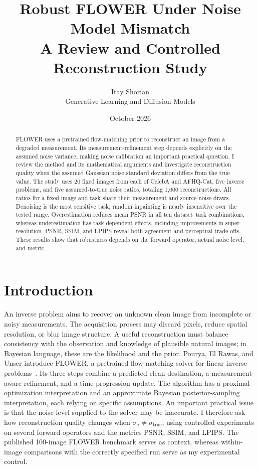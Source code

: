 \documentclass[11pt,a4paper]{article}
\title{
    \textbf{Robust FLOWER Under Noise Model Mismatch}\\[2mm]
    \large A Review and Controlled Reconstruction Study
}
\author{
    Itay Shorian\\
    Generative Learning and Diffusion Models
}
\date{October 2026}
\newcommand{\sx}{\sigma_{\mathrm{true}}}
\newcommand{\sa}{\sigma_a}
\begin{document}
\maketitle


\begin{abstract}

\noindent FLOWER uses a pretrained flow-matching prior to reconstruct an image
from a degraded measurement. Its measurement-refinement step depends
explicitly on the assumed noise variance, making noise calibration
an important practical question.
I review the method and its mathematical arguments and investigate
reconstruction quality when the assumed Gaussian noise standard
deviation differs from the true value.
The study uses 20 fixed images from each of CelebA and AFHQ-Cat,
five inverse problems, and five assumed-to-true noise ratios,
totaling 1,000 reconstructions. All ratios for a fixed image and task
share their measurement and source-noise draws.
Denoising is the most sensitive task; random inpainting is nearly
insensitive over the tested range. Overestimation reduces mean PSNR
in all ten dataset--task combinations, whereas underestimation has
task-dependent effects, including improvements in super-resolution.
PSNR, SSIM, and LPIPS reveal both agreement and perceptual trade-offs.
These results show that robustness depends on the forward operator,
actual noise level, and metric.
\end{abstract}



\section{Introduction}

An inverse problem aims to recover an unknown clean image from
incomplete or noisy measurements. The acquisition process may discard
pixels, reduce spatial resolution, or blur image structure.
A useful reconstruction must balance consistency with the observation
and knowledge of plausible natural images; in Bayesian language,
these are the likelihood and the prior.
Pourya, El Rawas, and Unser introduce FLOWER, a pretrained
flow-matching solver for linear inverse problems~\cite{flower}.
Its three steps combine a predicted clean destination,
a measurement-aware refinement, and a time-progression update.
The algorithm has a proximal-optimization interpretation and an
approximate Bayesian posterior-sampling interpretation, each relying
on specific assumptions.
An important practical issue is that the noise level supplied to
the solver may be inaccurate. I therefore ask how reconstruction
quality changes when $\sa\ne\sx$, using controlled experiments
on several forward operators and the metrics PSNR, SSIM, and LPIPS.
The published 100-image FLOWER benchmark serves as context,
whereas within-image comparisons with the correctly specified run
serve as my experimental control.
\end{document}
